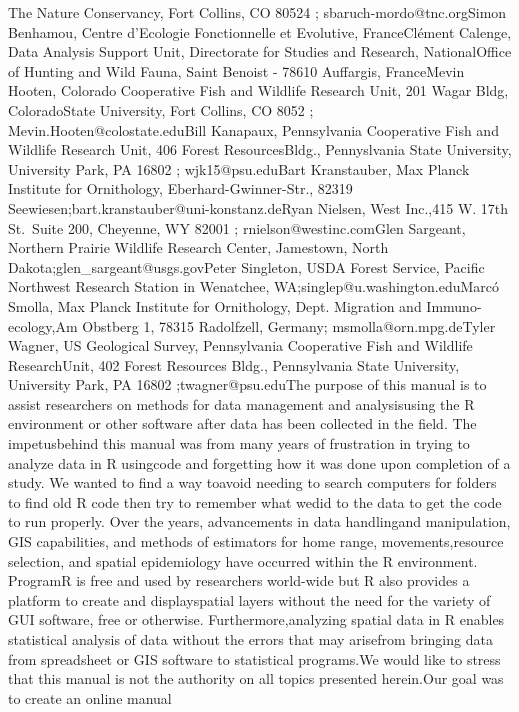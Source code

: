 \documentclass[
  letterpaper,
  DIV=11,
  numbers=noendperiod]{scrreprt}
\begin{document}
{The Nature Conservancy, Fort Collins, CO 80524 ;
sbaruch-mordo@tnc.orgSimon Benhamou, Centre d'Ecologie Fonctionnelle et
Evolutive, FranceClément Calenge, Data Analysis Support Unit,
Directorate for Studies and Research, NationalOffice of Hunting and Wild
Fauna, Saint Benoist - 78610 Auffargis, FranceMevin Hooten, Colorado
Cooperative Fish and Wildlife Research Unit, 201 Wagar Bldg,
ColoradoState University, Fort Collins, CO 8052 ;
Mevin.Hooten@colostate.eduBill Kanapaux, Pennsylvania Cooperative Fish
and Wildlife Research Unit, 406 Forest ResourcesBldg., Pennyslvania
State University, University Park, PA 16802 ; wjk15@psu.eduBart
Kranstauber, Max Planck Institute for Ornithology,
Eberhard-Gwinner-Str., 82319
Seewiesen;bart.kranstauber@uni-konstanz.deRyan Nielsen, West Inc.,415 W.
17th St.~Suite 200, Cheyenne, WY 82001 ; rnielson@westinc.comGlen
Sargeant, Northern Prairie Wildlife Research Center, Jamestown, North
Dakota;glen\_sargeant@usgs.govPeter Singleton, USDA Forest Service,
Pacific Northwest Research Station in Wenatchee,
WA;singlep@u.washington.eduMarcó Smolla, Max Planck Institute for
Ornithology, Dept. Migration and Immuno-ecology,Am Obstberg 1, 78315
Radolfzell, Germany; msmolla@orn.mpg.deTyler Wagner, US Geological
Survey, Pennsylvania Cooperative Fish and Wildlife ResearchUnit, 402
Forest Resources Bldg., Pennsylvania State University, University Park,
PA 16802 ;twagner@psu.edu}{The purpose of this manual is to assist
researchers on methods for data management and analysisusing the R
environment or other software after data has been collected in the
field. The impetusbehind this manual was from many years of frustration
in trying to analyze data in R usingcode and forgetting how it was done
upon completion of a study. We wanted to find a way toavoid needing to
search computers for folders to find old R code then try to remember
what wedid to the data to get the code to run properly. Over the years,
advancements in data handlingand manipulation, GIS capabilities, and
methods of estimators for home range, movements,resource selection, and
spatial epidemiology have occurred within the R environment. ProgramR is
free and used by researchers world-wide but R also provides a platform
to create and displayspatial layers without the need for the variety of
GUI software, free or otherwise. Furthermore,analyzing spatial data in R
enables statistical analysis of data without the errors that may
arisefrom bringing data from spreadsheet or GIS software to statistical
programs.We would like to stress that this manual is not the authority
on all topics presented herein.Our goal was to create an online manual
}
\end{document}
